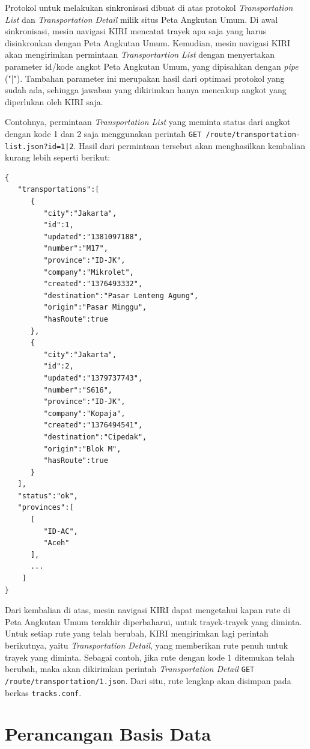 Protokol untuk melakukan sinkronisasi dibuat di atas protokol \textit{Transportation List} dan \textit{Transportation Detail} milik situs Peta Angkutan Umum. Di awal sinkronisasi, mesin navigasi KIRI mencatat trayek apa saja yang harus disinkronkan dengan Peta Angkutan Umum. Kemudian, mesin navigasi KIRI akan mengirimkan permintaan \textit{Transportartion List} dengan menyertakan parameter id/kode angkot Peta Angkutan Umum, yang dipisahkan dengan \textit{pipe} ("|"). Tambahan parameter ini merupakan hasil dari optimasi protokol yang sudah ada, sehingga jawaban yang dikirimkan hanya mencakup angkot yang diperlukan oleh KIRI saja.

Contohnya, permintaan \textit{Transportation List} yang meminta status dari angkot dengan kode 1 dan 2 saja menggunakan perintah \texttt{GET /route/transportation-list.json?id=1|2}. Hasil dari permintaan tersebut akan menghasilkan kembalian kurang lebih seperti berikut:

\begin{lstlisting}
{
   "transportations":[
      {
         "city":"Jakarta",
         "id":1,
         "updated":"1381097188",
         "number":"M17",
         "province":"ID-JK",
         "company":"Mikrolet",
         "created":"1376493332",
         "destination":"Pasar Lenteng Agung",
         "origin":"Pasar Minggu",
         "hasRoute":true
      },
      {
         "city":"Jakarta",
         "id":2,
         "updated":"1379737743",
         "number":"S616",
         "province":"ID-JK",
         "company":"Kopaja",
         "created":"1376494541",
         "destination":"Cipedak",
         "origin":"Blok M",
         "hasRoute":true
      }
   ],
   "status":"ok",
   "provinces":[
      [
         "ID-AC",
         "Aceh"
      ],
      ...
    ]
}
\end{lstlisting}

Dari kembalian di atas, mesin navigasi KIRI dapat mengetahui kapan rute di Peta Angkutan Umum terakhir diperbaharui, untuk trayek-trayek yang diminta. Untuk setiap rute yang telah berubah, KIRI mengirimkan lagi perintah berikutnya, yaitu \textit{Transportation Detail}, yang memberikan rute penuh untuk trayek yang diminta. Sebagai contoh, jika rute dengan kode 1 ditemukan telah berubah, maka akan dikirimkan perintah \textit{Transportation Detail} \texttt{GET /route/transportation/1.json}. Dari situ, rute lengkap akan disimpan pada berkas \texttt{tracks.conf}.

\section{Perancangan Basis Data}

